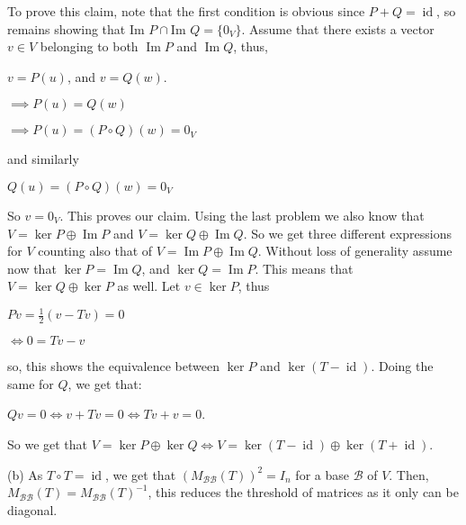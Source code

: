 \documentclass{article}
\theoremstyle{remark}
\begin{document}
\begin{enumerate}
        To prove this claim, note that the first condition is obvious since $P + Q = \operatorname{id}$, so remains showing that
        $\text{Im } P \cap \text{Im } Q = \{0_V\}$. Assume that there exists a vector $v \in V$ belonging to both $\operatorname{Im }P$ and $\operatorname{Im }Q$, thus,
        \begin{center}
            $v = P(u)$, and $v = Q(w)$.
        \end{center}
        \begin{center}
            $\implies P(u) = Q(w)$
        \end{center}
        \begin{center}
            $\implies P(u) = (P\circ Q)(w) = 0_V$
        \end{center}
        and similarly
        \begin{center}
            $Q(u) = (P\circ Q)(w) = 0_V$
        \end{center}
        So $v = 0_V$. This proves our claim. Using the last problem we also know that $V = \ker P \oplus \operatorname{Im }P$ and $V = \ker Q \oplus \operatorname{Im }Q$.
        So we get three different expressions for $V$ counting also that of $V = \operatorname{Im }P \oplus \operatorname{Im }Q$.
        Without loss of generality assume now that $\ker P = \operatorname{Im }Q$, and $\ker Q = \operatorname{Im }P$.
        This means that $V = \ker Q \oplus \ker P$ as well.
        Let $v \in \ker P$, thus
        \begin{center}
            $\displaystyle Pv = \frac{1}{2}(v - Tv) = 0$
        \end{center}

        \begin{center}
            $\displaystyle \iff 0 = Tv - v$
        \end{center}
        so, this shows the equivalence between $\ker P$ and $\ker (T - \operatorname{id})$.
        Doing the same for $Q$, we get that:
        \begin{center}
            $\displaystyle Qv = 0 \iff v + Tv = 0 \iff Tv + v = 0$.
        \end{center}
        So we get that $V = \ker P \oplus \ker Q \iff V = \ker(T- \operatorname{id}) \oplus \ker(T + \operatorname{id})$.

        (b) As $T\circ T = \operatorname{id}$, we get that $(M_\mathcal{BB}(T))^2 = I_n$ for a base $\mathcal{B}$ of $V$.
        Then, $M_\mathcal{BB}(T) = M_\mathcal{BB}(T)^{-1}$, this reduces the threshold of matrices as it only can be diagonal.
        

\end{enumerate}
\end{document}
